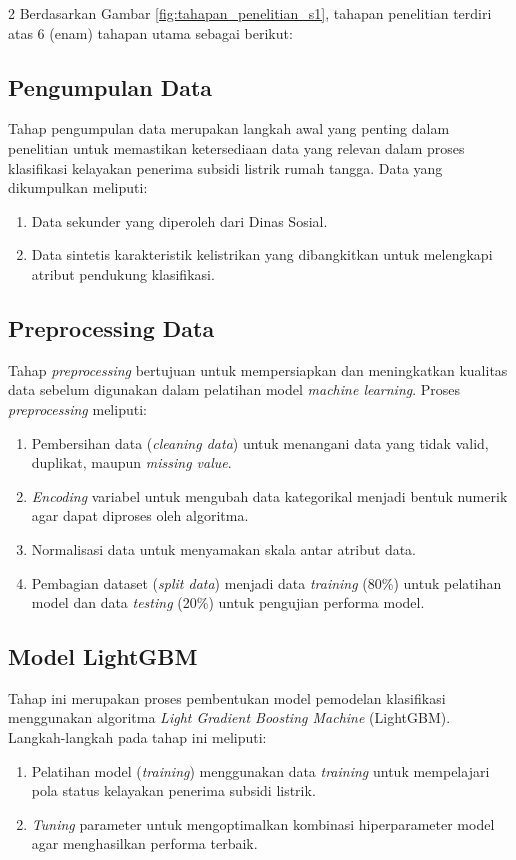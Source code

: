 \documentclass[12pt, a4paper, onecolumn, oneside]{report}
\begin{document}
\begin{spacing}{2}
Berdasarkan Gambar \ref{fig:tahapan_penelitian_s1}, tahapan penelitian terdiri atas 6 (enam) tahapan utama sebagai berikut:

\subsection{Pengumpulan Data}
Tahap pengumpulan data merupakan langkah awal yang penting dalam penelitian untuk memastikan ketersediaan data yang relevan dalam proses klasifikasi kelayakan penerima subsidi listrik rumah tangga. Data yang dikumpulkan meliputi:
\begin{enumerate}
    \item Data sekunder yang diperoleh dari Dinas Sosial.
    \item Data sintetis karakteristik kelistrikan yang dibangkitkan untuk melengkapi atribut pendukung klasifikasi.
\end{enumerate}

\subsection{Preprocessing Data}
Tahap \textit{preprocessing} bertujuan untuk mempersiapkan dan meningkatkan kualitas data sebelum digunakan dalam pelatihan model \textit{machine learning}. Proses \textit{preprocessing} meliputi:
\begin{enumerate}
    \item Pembersihan data (\textit{cleaning data}) untuk menangani data yang tidak valid, duplikat, maupun \textit{missing value}.
    \item \textit{Encoding} variabel untuk mengubah data kategorikal menjadi bentuk numerik agar dapat diproses oleh algoritma.
    \item Normalisasi data untuk menyamakan skala antar atribut data.
    \item Pembagian dataset (\textit{split data}) menjadi data \textit{training} (80\%) untuk pelatihan model dan data \textit{testing} (20\%) untuk pengujian performa model.
\end{enumerate}

\subsection{Model LightGBM}
Tahap ini merupakan proses pembentukan model pemodelan klasifikasi menggunakan algoritma \textit{Light Gradient Boosting Machine} (LightGBM). Langkah-langkah pada tahap ini meliputi:
\begin{enumerate}
    \item Pelatihan model (\textit{training}) menggunakan data \textit{training} untuk mempelajari pola status kelayakan penerima subsidi listrik.
    \item \textit{Tuning} parameter untuk mengoptimalkan kombinasi hiperparameter model agar menghasilkan performa terbaik.
\end{enumerate}


\end{spacing}
\end{document}
